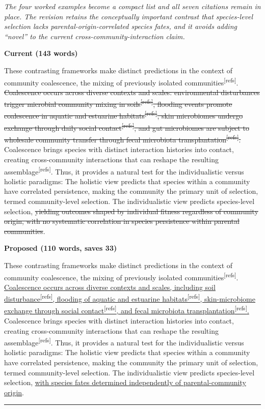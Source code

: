 \documentclass[11pt,a4paper]{article}
\newcommand{\citep}[1]{\textsuperscript{[refs]}}
\newcommand{\cutx}[1]{{\color{CutRed}\sout{#1}}}
\newcommand{\newx}[1]{{\color{CutRed}\uline{#1}}}
\newcommand{\rationale}[1]{{\color{GrayNote}\small\textit{#1}}\par\smallskip}
\newcommand{\panel}[1]{\par\smallskip\noindent\textbf{\small #1}\par}
\newcommand{\decision}{\par\smallskip\noindent{\color{GrayNote}\small$\square$~accept\quad$\square$~reject\quad$\square$~modify}\par
\noindent\rule{\linewidth}{0.4pt}}
\begin{document}
\rationale{The four worked examples become a compact list and all seven citations remain in place. The revision retains the conceptually important contrast that species-level selection lacks parental-origin-correlated species fates, and it avoids adding ``novel'' to the current cross-community-interaction claim.}
\panel{Current (143 words)}
These contrasting frameworks make distinct predictions in the context of community coalescence, the mixing of previously isolated communities\citep{Rillig2015, Lechon2021}. \cutx{Coalescence occurs across diverse contexts and scales: environmental disturbances trigger microbial community mixing in soils\citep{Huet2023, Bresciani2025}, flooding events promote coalescence in aquatic and estuarine habitats\citep{Liu2024}, skin microbiomes undergo exchange through daily social contact\citep{Sarkar2024}, and gut microbiomes are subject to wholesale community transfer through fecal microbiota transplantation\citep{Xiao2020, Gupta2016}. }Coalescence brings species with distinct interaction histories into contact, creating cross-community interactions that can reshape the resulting assemblage\citep{Rillig2015}. Thus, it provides a natural test for the individualistic versus holistic paradigms: The holistic view predicts that species within a community have correlated persistence, making the community the primary unit of selection, termed community-level selection. The individualistic view predicts species-level selection, \cutx{yielding outcomes shaped by individual fitness regardless of community origin, with no systematic correlation in species persistence within parental communities}.
\panel{Proposed (110 words, saves 33)}
These contrasting frameworks make distinct predictions in the context of community coalescence, the mixing of previously isolated communities\citep{Rillig2015, Lechon2021}. \newx{Coalescence occurs across diverse contexts and scales, including soil disturbance\citep{Huet2023, Bresciani2025}, flooding of aquatic and estuarine habitats\citep{Liu2024}, skin-microbiome exchange through social contact\citep{Sarkar2024}, and fecal microbiota transplantation\citep{Xiao2020, Gupta2016}. }Coalescence brings species with distinct interaction histories into contact, creating cross-community interactions that can reshape the resulting assemblage\citep{Rillig2015}. Thus, it provides a natural test for the individualistic versus holistic paradigms: The holistic view predicts that species within a community have correlated persistence, making the community the primary unit of selection, termed community-level selection. The individualistic view predicts species-level selection, \newx{with species fates determined independently of parental-community origin}.
\decision
\end{document}
